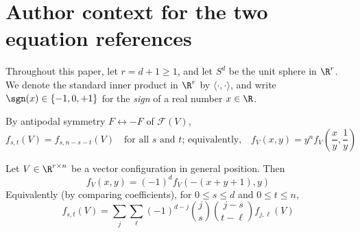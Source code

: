 \section*{Author context for the two equation references}
Throughout this paper, let $r=d+1 \geq 1$, and let $S^d$ be the unit sphere in $\R^r$. We denote the standard inner product in $\R^r$ by $\langle\cdot ,\cdot \rangle$, and write $\sgn(x)\in \{-1,0,+1\}$ for the \emph{sign} of a real number 
$x\in \R$. %
\begin{observation} 
\label{obs:f-antipodal-symm} By antipodal symmetry $F\leftrightarrow -F$ of $\mathcal{F}(V)$, 
\begin{equation}
\label{eq:f-symm}
f_{s,t}(V)=f_{s,n-s-t}(V) \quad \textrm{for all $s$ and $t$; equivalently,} \textstyle \quad f_V(x,y)= y^n f_V(\frac{x}{y},\frac{1}{y})
\end{equation}
\end{observation}
\begin{theorem}
\label{thm:DS-levels}
Let $V \in \R^{r\times n}$ be a vector configuration in general position. Then
\begin{equation}
\label{eq:DS-f-poly}
f_V(x,y)=(-1)^d f_V(-(x+y+1),y)
\end{equation}
Equivalently (by comparing coefficients), for $0\leq s\leq d$ and $0\leq t\leq n$,
\begin{equation}
\label{eq:DS-f-numbers}
f_{s,t}(V)=\sum_{j} \sum_{\ell} (-1)^{d-j} \binom{j}{s} \binom{j-s}{t-\ell} f_{j,\ell}(V) 
\end{equation}
\end{theorem}

